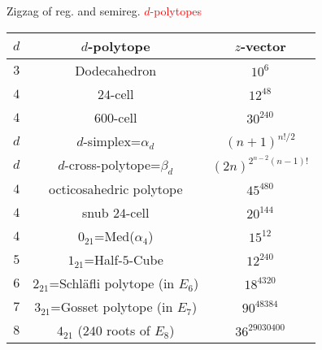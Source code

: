 \documentclass[%
pdf,
colorBG,
slideColor,
]{prosper}
\begin{document}
\begin{slide}{Zigzag of reg. and semireg. \textcolor{red}{$d$-polytopes}}

\vspace{-4mm}
\begin{center}
{\scriptsize
\begin{tabular}{||c|c|c||}
\hline
$d$ &$d$-polytope                        & $z$-vector\\
\hline
$3$&Dodecahedron               &$10^6$\\
$4$&$24$-cell                      &$12^{48}$\\
$4$&$600$-cell                     &$30^{240}$\\
$d$&$d$-simplex=$\alpha_d$         &$(n+1)^{n!/2}$\\
$d$&$d$-cross-polytope=$\beta_d$          &$(2n)^{2^{n-2}(n-1)!}$\\
\hline
$4$&octicosahedric polytope            &$45^{480}$\\
$4$&snub $24$-cell                 &$20^{144}$\\
$4$&$0_{21}$=Med($\alpha_4$)       &$15^{12}$\\
$5$&$1_{21}$=Half-$5$-Cube              &$12^{240}$\\
$6$&$2_{21}$=Schl\"afli polytope (in $E_6$)  &$18^{4320}$\\
$7$&$3_{21}$=Gosset polytope (in $E_7$) &$90^{48384}$\\
$8$&$4_{21}$ ($240$ roots of $E_8$)&$36^{29030400}$\\
\hline
\hline
\end{tabular}
}
\end{center}


\end{slide}
\end{document}
